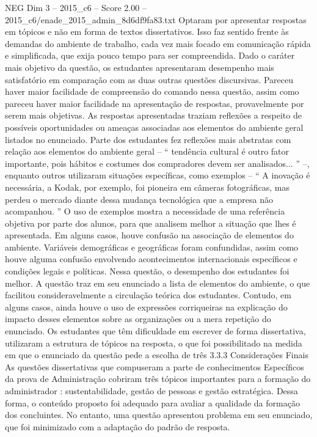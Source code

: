 \begin{textsample}{NEG Dim 3 – 2015\_c6 – Score 2.00 – 2015\_c6/enade\_2015\_admin\_8d6df9fa83.txt}
Optaram por apresentar respostas em tópicos e não em forma de textos dissertativos.
Isso faz sentido frente às demandas do ambiente de trabalho, cada vez mais focado em comunicação rápida e simplificada, que exija pouco tempo para ser compreendida.
Dado o caráter mais objetivo da questão, os estudantes apresentaram desempenho mais satisfatório em comparação com as duas outras questões discursivas.
Pareceu haver maior facilidade de compreensão do comando nessa questão, assim como pareceu haver maior facilidade na apresentação de respostas, provavelmente por serem mais objetivas.
As respostas apresentadas traziam reflexões a respeito de possíveis oportunidades ou ameaças associadas aos elementos do ambiente geral listados no enunciado.
Parte dos estudantes fez reflexões mais abstratas com relação aos elementos do ambiente geral – “ tendência cultural é outro fator importante, pois hábitos e costumes dos compradores devem ser analisados... ” –, enquanto outros utilizaram situações específicas, como exemplos – “ A inovação é necessária, a Kodak, por exemplo, foi pioneira em câmeras fotográficas, mas perdeu o mercado diante dessa mudança tecnológica que a empresa não acompanhou. ” O uso de exemplos mostra a necessidade de uma referência objetiva por parte dos alunos, para que analisem melhor a situação que lhes é apresentada.
Em alguns casos, houve confusão na associação de elementos do ambiente.
Variáveis demográficas e geográficas foram confundidas, assim como houve alguma confusão envolvendo acontecimentos internacionais específicos e condições legais e políticas.
Nessa questão, o desempenho dos estudantes foi melhor.
A questão traz em seu enunciado a lista de elementos do ambiente, o que facilitou consideravelmente a circulação teórica dos estudantes.
Contudo, em alguns casos, ainda houve o uso de expressões corriqueiras na explicação do impacto desses elementos sobre as organizações ou a mera repetição do enunciado.
Os estudantes que têm dificuldade em escrever de forma dissertativa, utilizaram a estrutura de tópicos na resposta, o que foi possibilitado na medida em que o enunciado da questão pede a escolha de três 3.3.3 Considerações Finais As questões dissertativas que compuseram a parte de conhecimentos Específicos da prova de Administração cobriram três tópicos importantes para a formação do administrador : sustentabilidade, gestão de pessoas e gestão estratégica.
Dessa forma, o conteúdo proposto foi adequado para avaliar a qualidade da formação dos concluintes.
No entanto, uma questão apresentou problema em seu enunciado, que foi minimizado com a adaptação do padrão de resposta.

\end{textsample}
